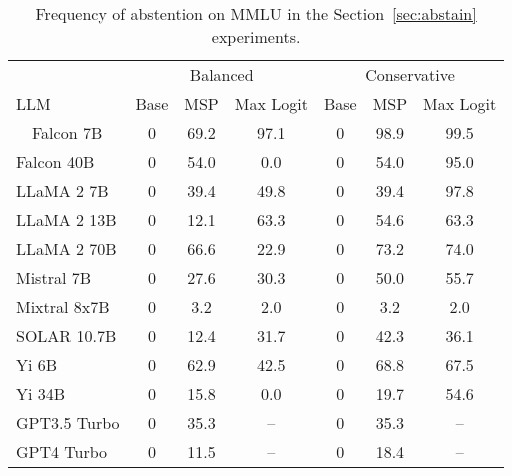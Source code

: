 \begin{table*}[h]
\centering
\caption{Frequency of abstention on MMLU in the Section~\ref{sec:abstain} experiments.}
\label{tab:mmlu_pct_abstained}
\begin{tabular}{lcccccc}
\toprule
& \multicolumn{3}{c}{Balanced} & \multicolumn{3}{c}{Conservative} \\ 
LLM & Base & MSP & Max Logit & Base & MSP & Max Logit \\ 
\cmidrule(lr){1-1}\cmidrule(lr){2-4}\cmidrule(lr){5-7}\ \ 
Falcon 7B & 0 & 69.2 & 97.1 & 0 & 98.9 & 99.5\\
Falcon 40B & 0 & 54.0 & 0.0 & 0 & 54.0 & 95.0\\
LLaMA 2 7B & 0 & 39.4 & 49.8 & 0 & 39.4 & 97.8\\
LLaMA 2 13B & 0 & 12.1 & 63.3 & 0 & 54.6 & 63.3\\
LLaMA 2 70B & 0 & 66.6 & 22.9 & 0 & 73.2 & 74.0\\
Mistral 7B & 0 & 27.6 & 30.3 & 0 & 50.0 & 55.7\\
Mixtral 8x7B & 0 & 3.2 & 2.0 & 0 & 3.2 & 2.0\\
SOLAR 10.7B & 0 & 12.4 & 31.7 & 0 & 42.3 & 36.1\\
Yi 6B & 0 & 62.9 & 42.5 & 0 & 68.8 & 67.5\\
Yi 34B & 0 & 15.8 & 0.0 & 0 & 19.7 & 54.6\\
GPT3.5 Turbo & 0 & 35.3 & -- & 0 & 35.3 & --\\
GPT4 Turbo & 0 & 11.5 & -- & 0 & 18.4 & --\\
\bottomrule
\end{tabular}
\end{table*}
